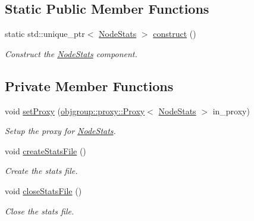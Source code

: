 \subsection*{Static Public Member Functions}
\begin{DoxyCompactItemize}
\item 
static std\+::unique\+\_\+ptr$<$ \hyperlink{structvt_1_1vrt_1_1collection_1_1balance_1_1_node_stats}{Node\+Stats} $>$ \hyperlink{structvt_1_1vrt_1_1collection_1_1balance_1_1_node_stats_a6c57b741ccef7c6d51155c3630dc380a}{construct} ()
\begin{DoxyCompactList}\small\item\em Construct the \hyperlink{structvt_1_1vrt_1_1collection_1_1balance_1_1_node_stats}{Node\+Stats} component. \end{DoxyCompactList}\end{DoxyCompactItemize}
\subsection*{Private Member Functions}
\begin{DoxyCompactItemize}
\item 
void \hyperlink{structvt_1_1vrt_1_1collection_1_1balance_1_1_node_stats_a30e9e5def6e7d6d31cd6597c5fea2345}{set\+Proxy} (\hyperlink{structvt_1_1objgroup_1_1proxy_1_1_proxy}{objgroup\+::proxy\+::\+Proxy}$<$ \hyperlink{structvt_1_1vrt_1_1collection_1_1balance_1_1_node_stats}{Node\+Stats} $>$ in\+\_\+proxy)
\begin{DoxyCompactList}\small\item\em Setup the proxy for {\ttfamily \hyperlink{structvt_1_1vrt_1_1collection_1_1balance_1_1_node_stats}{Node\+Stats}}. \end{DoxyCompactList}\item 
void \hyperlink{structvt_1_1vrt_1_1collection_1_1balance_1_1_node_stats_a2da26dd82180cbc721fce9c8aa1814a4}{create\+Stats\+File} ()
\begin{DoxyCompactList}\small\item\em Create the stats file. \end{DoxyCompactList}\item 
void \hyperlink{structvt_1_1vrt_1_1collection_1_1balance_1_1_node_stats_abd5133b734537e6a9190e9976f009f89}{close\+Stats\+File} ()
\begin{DoxyCompactList}\small\item\em Close the stats file. \end{DoxyCompactList}\end{DoxyCompactItemize}
